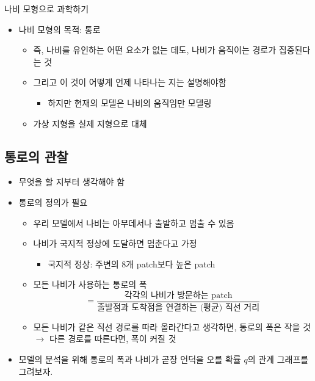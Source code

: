 \documentclass[hyperref={unicode}]{beamer}
\begin{document}
\begin{frame}{나비 모형으로 과학하기}
\begin{itemize}
\item 나비 모형의 목적: 통로
	\begin{itemize}
	\item 즉, 나비를 유인하는 어떤 요소가 없는 데도, 나비가 움직이는 경로가 집중된다는 것
	\item 그리고 이 것이 어떻게 언제 나타나는 지는 설명해야함
		\begin{itemize}
		\item 하지만 현재의 모델은 나비의 움직임만 모델링
		\end{itemize}
	\item 가상 지형을 실제 지형으로 대체 
	\end{itemize}
\end{itemize}	
\end{frame}

\subsection*{통로의 관찰}
\begin{frame}
\begin{itemize}
\item 무엇을 할 지부터 생각해야 함
\item 통로의 정의가 필요
	\begin{itemize}
	\item 우리 모델에서 나비는 아무데서나 출발하고 멈출 수 있음
	\item 나비가 국지적 정상에 도달하면 멈춘다고 가정
		\begin{itemize}
		\item 국지적 정상: 주변의 8개 patch보다 높은 patch
		\end{itemize}
	\item 모든 나비가 사용하는 통로의 폭
		\begin{equation*}
						= \dfrac{\text{각각의 나비가 방문하는 patch}}{\text{출발점과 도착점을 연결하는 (평균) 직선 거리}}
		\end{equation*}
	\item 모든 나비가 같은 직선 경로를 따라 올라간다고 생각하면, 통로의 폭은 작을 것 $\rightarrow$ 다른 경로를 따른다면, 폭이 커질 것
	\end{itemize}
\item 모델의 분석을 위해 통로의 폭과 나비가 곧장 언덕을 오를 확률 $q$의 관계 그래프를 그려보자.
\end{itemize}	
\end{frame}
\end{document}
